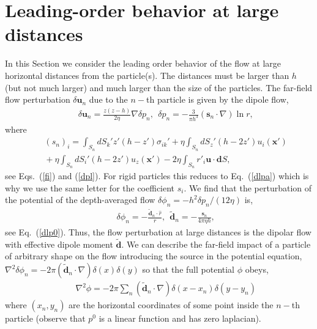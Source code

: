 \section{Leading-order behavior at large distances}

In this Section we consider the leading order behavior of the flow at large horizontal distances from the particle(s). The distances must be larger than $h$ (but not much larger) and much larger than the size of the particles.
The far-field flow perturbation $\delta \bm u_n$ due to the $n-$th particle is given by the dipole flow,
\begin{eqnarray}&&\!\!\!\!\!\!
\delta \bm u_n=\frac{z(z\!-\!h)}{2\eta}\nabla \delta p_n,\ \ \delta p_n=-\frac{3}{\pi h^3}\!(\bm s_n\cdot\nabla) \ln r,\label{flowdp}
\end{eqnarray}
where
\begin{eqnarray}&&\!\!\!\!\!\!
(s_n)_i=\int_{S_n}dS_k'
z'(h-z') \sigma_{ik}'+\eta\int_{S_n}dS_z' (h\!-\!2z')u_{i}(\bm x')\nonumber\\&&\!\!\!\!\!\!+\eta\int_{S_n}dS_i' (h\!-\!2z')u_{z}(\bm x')
-2\eta\int_{S_n}r'_i \bm u\cdot{\bm dS},
\end{eqnarray}
see Eqs.~(\ref{fi}) and (\ref{dpl}). For rigid particles this reduces to Eq.~(\ref{dlpa}) which is why we use the same letter for the coefficient $s_i$. We find that the perturbation of the potential of the
depth-averaged flow $\delta \phi_n=-h^2 \delta p_n/(12\eta)$ is,
\begin{eqnarray}&&\!\!\!\!\!\!\!\!\!\!\!\!\!
\delta \phi_n=-\frac{\tilde {\bm d}_n\cdot{\hat r}}{r},\ \ \tilde {\bm d}_n=-\frac{\bm s_n }{4\pi\eta h}, \label{tld}
\end{eqnarray}
see Eq.~(\ref{dlp0}). Thus, the flow perturbation at large distances is the dipolar flow with effective dipole moment $\tilde {\bm d}$. 
We can describe the far-field impact of a particle of arbitrary shape on the flow introducing
the source in the potential equation, $\nabla^2\delta\phi_n=-2\pi(\tilde {\bm d}_n\cdot\nabla)\delta(x)\delta(y)$ so that the full potential $\phi$ obeys,
\begin{eqnarray}&&\!\!\!\!\!\!\!\!\!\!\!\!\!
\nabla^2\phi=-2\pi\sum_n(\tilde {\bm d}_n\cdot\nabla)\delta(x-x_n)\delta(y-y_n)
\end{eqnarray}
where $(x_n, y_n)$ are the horizontal coordinates of some point inside the $n-$th particle (observe that $p^0$ is a linear function and has zero laplacian).

